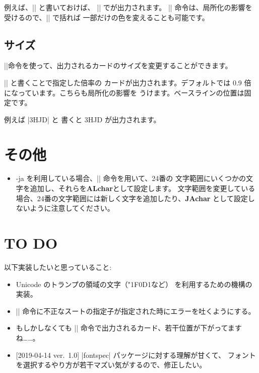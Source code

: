 \documentclass{jlreq}
\begin{document}
例えば、|| と書いておけば、
|\hmH| で{\hmH}が出力されます。
|\definecolor| 命令は、局所化の影響を受けるので、|{}| で括れば
一部だけの色を変えることも可能です。

\subsection{サイズ}
|\tizset|命令を使って、出力されるカードのサイズを変更することができます。

|| と書くことで指定した倍率の
カードが出力されます。デフォルトでは 0.9 倍になっています。こちらも局所化の影響を
うけます。ベースラインの位置は固定です。

例えば |{\trump 3H}\trump JD| と
書くと {\trump 3H}\trump JD が出力されます。

\section{その他}
\begin{itemize}
\item \LuaLaTeX-ja を利用している場合、|\ltjdefcharrange| 命令を用いて、24番の
	文字範囲にいくつかの文字を追加し、それらを\textbf{ALchar}として設定します。
	文字範囲を変更している場合、24番の文字範囲には新しく文字を追加したり、\textbf{JAchar}
	として設定しないように注意してください。
\end{itemize}

\section{TO DO}
以下実装したいと思っていること:
\begin{itemize}
\item Unicode のトランプの領域の文字（{\char"1F0D1}など）
	を利用するための機構の実装。
\item |\trump| 命令に不正なスートの指定子が指定された時にエラーを吐くようにする。
\item もしかしなくても |\joker| 命令で出力されるカード、若干位置が下がってますね……。
\item {[2019-04-14 ver.~1.0]} |fontspec| パッケージに対する理解が甘くて、
	フォントを選択するやり方が若干マズい気がするので、修正したい。
\end{itemize}
\end{document}
